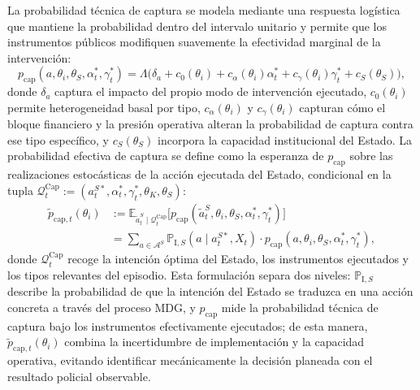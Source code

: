 \documentclass[review,authoryear,12pt]{elsarticle}
\theoremstyle{plain}
\theoremstyle{definition}
\newcommand{\E}{\mathbb{E}}
\newcommand{\1}{\mathbf{1}}
\newcommand{\ProbI}[1]{\mathbb{P}_{\mathrm{I},#1}}
\begin{document}
La probabilidad técnica de captura se modela mediante una respuesta logística que mantiene la probabilidad dentro del intervalo unitario y permite que los instrumentos públicos modifiquen suavemente la efectividad marginal de la intervención:
\begin{equation}
p_{\mathrm{cap}}(a,\theta_i,\theta_S,\alpha_t^\ast,\gamma_t^\ast)=\Lambda\bigl(\delta_a+c_0(\theta_i)+c_\alpha(\theta_i)\alpha_t^\ast+c_\gamma(\theta_i)\gamma_t^\ast+c_S(\theta_S)\bigr),
\label{eq:p-cap}
\end{equation}
donde $\delta_a$ captura el impacto del propio modo de intervención ejecutado, $c_0(\theta_i)$ permite heterogeneidad basal por tipo, $c_\alpha(\theta_i)$ y $c_\gamma(\theta_i)$ capturan cómo el bloque financiero y la presión operativa alteran la probabilidad de captura contra ese tipo específico, y $c_S(\theta_S)$ incorpora la capacidad institucional del Estado. La probabilidad efectiva de captura se define como la esperanza de $p_{\mathrm{cap}}$ sobre las realizaciones estocásticas de la acción ejecutada del Estado, condicional en la tupla $\mathcal{Q}_t^{\mathrm{Cap}}:=(a_t^{S\ast},\alpha_t^\ast,\gamma_t^\ast,\theta_K,\theta_S)$:
\begin{align}
\tilde{p}_{\mathrm{cap},t}(\theta_i)
&:=\E_{\tilde{a}_t^S\mid\mathcal{Q}_t^{\mathrm{Cap}}}\!\bigl[p_{\mathrm{cap}}(\tilde{a}_t^S,\theta_i,\theta_S,\alpha_t^\ast,\gamma_t^\ast)\bigr]\nonumber\\
&=\sum_{a\in\mathcal{A}^S}\ProbI{S}(a\mid a_t^{S\ast},X_t)\cdot p_{\mathrm{cap}}(a,\theta_i,\theta_S,\alpha_t^\ast,\gamma_t^\ast),
\label{eq:p-cap-tilde}
\end{align}
donde $\mathcal{Q}_t^{\mathrm{Cap}}$ recoge la intención óptima del Estado, los instrumentos ejecutados y los tipos relevantes del episodio. Esta formulación separa dos niveles: $\ProbI{S}$ describe la probabilidad de que la intención del Estado se traduzca en una acción concreta a través del proceso MDG, y $p_{\mathrm{cap}}$ mide la probabilidad técnica de captura bajo los instrumentos efectivamente ejecutados; de esta manera, $\tilde{p}_{\mathrm{cap},t}(\theta_i)$ combina la incertidumbre de implementación y la capacidad operativa, evitando identificar mecánicamente la decisión planeada con el resultado policial observable.
\end{document}
